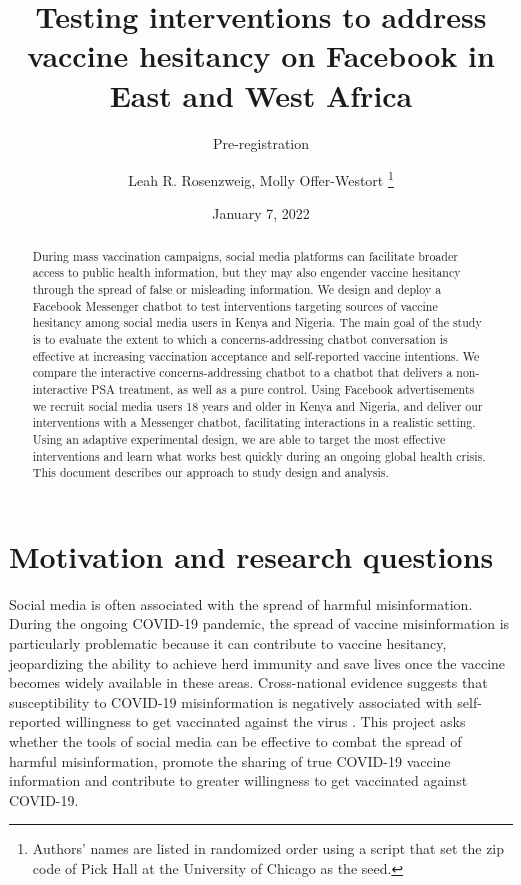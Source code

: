 \documentclass[letterpaper, 12pt, parskip=full,DIV=10]{scrartcl}
\title{Testing interventions to address vaccine hesitancy on Facebook in East and West Africa}
\subtitle{Pre-registration}
\author{Leah R. Rosenzweig, Molly Offer-Westort \thanks{Authors' names are listed in randomized order using a script that set the zip code of Pick Hall at the University of Chicago as the seed. } }%
\date{January 7, 2022}
\begin{document}
%

\maketitle%

\begin{abstract}
During mass vaccination campaigns, social media platforms can facilitate broader access to public health information, but they may also engender vaccine hesitancy through the spread of false or misleading information. We design and deploy a Facebook Messenger chatbot to test interventions targeting sources of vaccine hesitancy among social media users in Kenya and Nigeria. The main goal of the study is to evaluate the extent to which a concerns-addressing chatbot conversation is effective at increasing vaccination acceptance and self-reported vaccine intentions. We compare the interactive concerns-addressing chatbot to a chatbot that delivers a non-interactive PSA treatment, as well as a pure control. Using Facebook advertisements we recruit social media users 18 years and older in Kenya and Nigeria, and deliver our interventions with a Messenger chatbot, facilitating interactions in a realistic setting. Using an adaptive experimental design, we are able to target the most effective interventions and learn what works best quickly during an ongoing global health crisis. This document describes our approach to study design and analysis. 

\end{abstract}

\clearpage

\tableofcontents%
\clearpage



\section{Motivation and research questions}
Social media is often associated with the spread of harmful misinformation. During the ongoing COVID-19 pandemic, the spread of vaccine misinformation is particularly problematic because it can contribute to vaccine hesitancy, jeopardizing the ability to achieve herd immunity and save lives once the vaccine becomes widely available in these areas. Cross-national evidence suggests that susceptibility to COVID-19 misinformation is negatively associated with self-reported willingness to get vaccinated against the virus \citep{roozenbeek2020susceptibility}. This project asks whether the tools of social media can be effective to combat the spread of harmful misinformation, promote the sharing of true COVID-19 vaccine information and contribute to greater willingness to get vaccinated against COVID-19. 
\end{document}
